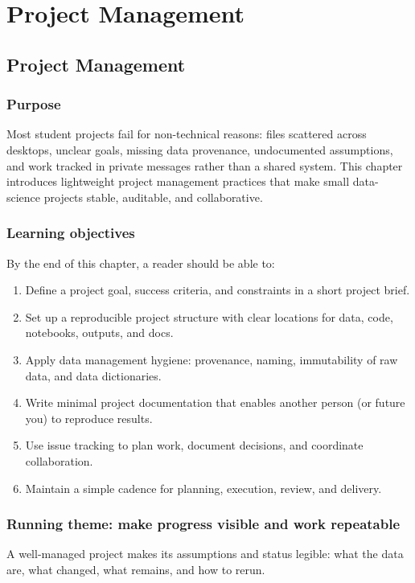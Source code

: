 \part{Project Management}
\chapter{Project Management}
\label{ch:project-management}

\section*{Purpose}
Most student projects fail for non-technical reasons: files scattered across desktops, unclear goals, missing data provenance, undocumented assumptions, and work tracked in private messages rather than a shared system. This chapter introduces lightweight project management practices that make small data-science projects stable, auditable, and collaborative.

\section*{Learning objectives}
By the end of this chapter, a reader should be able to:
\begin{enumerate}
\item Define a project goal, success criteria, and constraints in a short project brief.
\item Set up a reproducible project structure with clear locations for data, code, notebooks, outputs, and docs.
\item Apply data management hygiene: provenance, naming, immutability of raw data, and data dictionaries.
\item Write minimal project documentation that enables another person (or future you) to reproduce results.
\item Use issue tracking to plan work, document decisions, and coordinate collaboration.
\item Maintain a simple cadence for planning, execution, review, and delivery.
\end{enumerate}

\section*{Running theme: make progress visible and work repeatable}
A well-managed project makes its assumptions and status legible: what the data are, what changed, what remains, and how to rerun.

